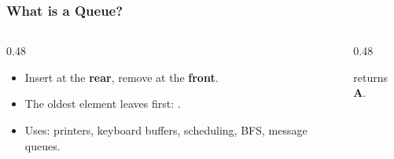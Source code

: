 \documentclass[aspectratio=169,10pt,compress]{beamer}
\begin{document}
\begin{frame}[t,fragile] \frametitle{What is a Queue?}
  \begin{columns}[T]
    \begin{column}{0.48\textwidth}
      \begin{itemize}
        \item Insert at the \textbf{rear}, remove at the \textbf{front}.
        \item The oldest element leaves first: .
        \item Uses: printers, keyboard buffers, scheduling, BFS,
              message queues.
      \end{itemize}
    \end{column}
    \begin{column}{0.48\textwidth}
      \begin{center}
      \end{center}
      \small {} returns \textbf{A}.
    \end{column}
  \end{columns}
\end{frame}
\end{document}
